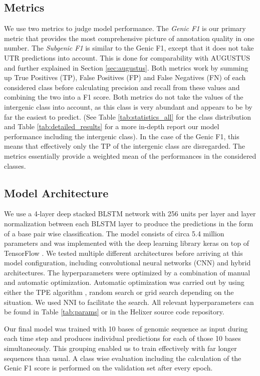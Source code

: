\documentclass{bioinfo}
\begin{document}
\begin{methods}
\subsection{Metrics}
We use two metrics to judge model performance. The {\it Genic F1} is our primary metric that provides the most comprehensive picture of annotation quality in one number. The {\it Subgenic F1} is similar to the Genic F1, except that it does not take UTR predictions into account. This is done for comparability with AUGUSTUS and further explained in Section \ref{sec:augustus}. Both metrics work by summing up True Positives (TP), False Positives (FP) and False Negatives (FN) of each considered class before calculating precision and recall from these values and combining the two into a F1 score. Both metrics do not take the values of the intergenic class into account, as this class is very abundant and appears to be by far the easiest to predict. (See Table \ref{tab:statistics_all} for the class distribution and Table \ref{tab:detailed_results} for a more in-depth report our model performance including the intergenic class). In the case of the Genic F1, this means that effectively only the TP of the intergenic class are disregarded. The metrics essentially provide a weighted mean of the performances in the considered classes. 

	
\subsection{Model Architecture}
\label{sec:model}
We use a 4-layer deep stacked BLSTM network with 256 units per layer and layer normalization \citep{ba2016layer} between each BLSTM layer to produce the predictions in the form of a base pair wise classification. The model consists of circa 5.4 million parameters and was implemented with the deep learning library keras \citep{chollet2015keras} on top of TensorFlow \citep{abadi2016tensorflow}. We tested multiple different architectures before arriving at this model configuration, including convolutional neural networks (CNN) and hybrid architectures. The hyperparameters were optimized by a combination of manual and automatic optimization. Automatic optimization was carried out by using either the TPE algorithm \citep{bergstra2011algorithms}, random search or grid search depending on the situation. We used NNI \citep{nni2019} to facilitate the search. All relevant hyperparameters can be found in Table \ref{tab:params} or in the Helixer source code repository. 
	
Our final model was trained with 10 bases of genomic sequence as input during each time step and produces individual predictions for each of those 10 bases simultaneously. This grouping enabled us to train effectively with far longer sequences than usual. A class wise evaluation including the calculation of the Genic F1 score is performed on the validation set after every epoch.


\end{methods}
\end{document}
